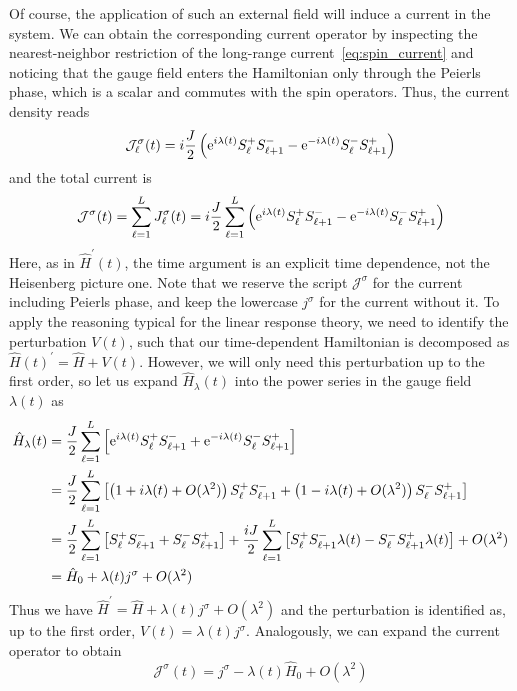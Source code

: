 Of course, the application of such an external field will induce a current in the system. We can obtain the
corresponding current operator by inspecting the nearest-neighbor restriction of the long-range
current~\eqref{eq:spin_current} and noticing that the gauge field enters the Hamiltonian only through
the Peierls phase, which is a scalar and commutes with the spin operators. Thus, the current density
reads
\begin{equation}
    \mathcal{J}^{\sigma }_{\ell}(t) = i\frac{J}{2} \left( \mathrm{e}^{i \lambda(t)} S^{+}_{\ell} S^{-}_{\ell+1} - \mathrm{e}^{-i \lambda(t)} S^{-}_{\ell}S^{+}_{\ell+1} \right)
\end{equation}
and the total current is
\begin{equation}
    \mathcal{J}^{\sigma } (t) = \sum_{\ell=1}^{L} J^{\sigma }_{\ell}(t)
    = i\frac{J}{2} \sum_{\ell=1}^{L} \left( \mathrm{e}^{i \lambda(t)} S^{+}_{\ell} S^{-}_{\ell+1} - \mathrm{e}^{-i \lambda(t)} S^{-}_{\ell}S^{+}_{\ell+1} \right)
    \label{eq:total_current}
\end{equation}
Here, as in \(\hat{H} ^{\prime} (t)\), the time argument is an explicit time dependence, not the Heisenberg picture one.
Note that we reserve the script \(\mathcal{J}^{\sigma}\) for the current including Peierls phase,
and keep the lowercase \(j^{\sigma }\) for the current without it.
To apply the reasoning typical for the linear response theory, we need to identify the perturbation
\(V(t)\), such that our time-dependent Hamiltonian is decomposed as \(\hat{H}(t)^{\prime} = \hat{H}  + V(t)\).
However, we will only need this perturbation up to the first order, so let us expand \(\hat{H} _{\lambda }(t)\)  into the
power series in the gauge field \(\lambda(t)\) as
\begin{align}
    \hat{H}_{\lambda }(t) & = \frac{J}{2} \sum_{\ell=1}^{L} \left[\mathrm{e}^{i \lambda(t)} S^{+}_{\ell} S^{-}_{\ell+1}
    + \mathrm{e}^{-i \lambda(t)} S^{-}_{\ell}S^{+}_{\ell+1} \right] \nonumber                                                                             \\
                    & = \frac{J}{2} \sum_{\ell=1}^{L} \left[\left( 1 + i \lambda (t) + O(\lambda ^2) \right)  S^{+}_{\ell} S^{-}_{\ell+1}
    + \left( 1 - i \lambda (t) + O(\lambda ^2) \right) S^{-}_{\ell}S^{+}_{\ell+1} \right] \nonumber                                                       \\
                    & = \frac{J}{2} \sum_{\ell=1}^{L} \left[ S^{+}_{\ell} S^{-}_{\ell+1} + S^{-}_{\ell}S^{+}_{\ell+1} \right] +
    \frac{i J}{2} \sum_{\ell=1}^{L} \left[ S^{+}_{\ell} S^{-}_{\ell+1} \lambda (t) - S^{-}_{\ell}S^{+}_{\ell+1} \lambda (t) \right] + O(\lambda ^2) \nonumber \\
                    & = \hat{H} _0 + \lambda(t) j^{\sigma } + O(\lambda ^2)
\end{align}
Thus we have \(\hat{H} ^{\prime} = \hat{H}  + \lambda (t) j^{\sigma } + O(\lambda ^2)\) and the perturbation is
identified as, up to the first order, \(V(t) = \lambda (t) j^{\sigma }\).
Analogously, we can expand the current operator to obtain
\begin{equation}
    \mathcal{J}^{\sigma } (t) = j^{\sigma } - \lambda(t) \hat{H} _0 + O(\lambda ^2)
\end{equation}

